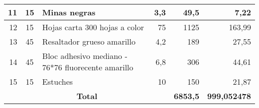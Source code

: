 \documentclass{article}
\begin{document}
\begin{table}[htbp]
{\begin{tabular}{|cccc|r|r|}
    \midrule
    \multicolumn{1}{|r|}{11} & \multicolumn{1}{c|}{15} & \multicolumn{1}{l|}{Minas negras} & \multicolumn{1}{r|}{3,3} & 49,5  & 7,22 \\
    \midrule
    \multicolumn{1}{|r|}{12} & \multicolumn{1}{c|}{15} & \multicolumn{1}{l|}{Hojas carta 300 hojas a color} & \multicolumn{1}{r|}{75} & 1125  & 163,99 \\
    \midrule
    \multicolumn{1}{|r|}{13} & \multicolumn{1}{c|}{45} & \multicolumn{1}{l|}{Resaltador grueso amarillo} & \multicolumn{1}{r|}{4,2} & 189   & 27,55 \\
    \midrule
    \multicolumn{1}{|r|}{14} & \multicolumn{1}{c|}{45} & \multicolumn{1}{l|}{Bloc adhesivo mediano - 76*76 fluorecente amarillo} & \multicolumn{1}{r|}{6,8} & 306   & 44,61 \\
    \midrule
    \multicolumn{1}{|r|}{15} & \multicolumn{1}{c|}{15} & \multicolumn{1}{l|}{Estuches} & \multicolumn{1}{r|}{10} & 150   & 21,87 \\
    \midrule
    \multicolumn{4}{|c|}{\textbf{Total}} & \textbf{6853,5} & \textbf{999,052478} \\
    \bottomrule
    \end{tabular}}%
  \label{tab:addlabel}%
\end{table}%
\end{document}
